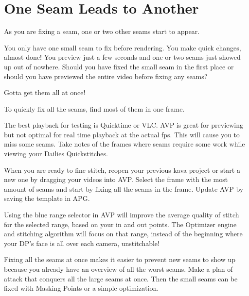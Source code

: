 \chapter{One Seam Leads to Another}
\pagecolor{white}
\label{chap:38}
\begin{fullwidth}


\problem

{\large As you are fixing a seam, one or two other seams start to appear. \par}

You only have one small seam to fix before rendering. You make quick changes, almost done! You preview just a few seconds and one or two seams just showed up out of nowhere. Should you have fixed the small seam in the first place or should you have previewed the entire video before fixing any seams?

\solutions

{\large Gotta get them all at once! \par}

To quickly fix all the seams, find most of them in one frame. 


The best playback for testing is Quicktime or VLC. AVP is great for previewing but not optimal for real time playback at the actual fps. This will cause you to miss some seams. Take notes of the frames where seams require some work while viewing your Dailies Quickstitches.


When you are ready to fine stitch, reopen your previous kava project or start a new one by dragging your videos into AVP. Select the frame with the most amount of seams and start by fixing all the seams in the frame. Update AVP by saving the template in APG.

Using the blue range selector in AVP will improve the average quality of stitch for the selected range, based on your in and out points. The Optimizer engine and stitching algorithm will focus on that range, instead of the beginning where your DP’s face is all over each camera, unstitchable!


Fixing all the seams at once makes it easier to prevent new seams to show up because you already have an overview of all the worst seams. Make a plan of attack that conquers all the large seams at once. Then the small seams can be fixed with Masking Points or a simple optimization.


\end{fullwidth}
